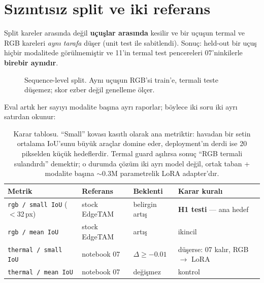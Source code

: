 \documentclass[11pt, paper=a4, DIV=14, parskip=half, numbers=noenddot]{scrartcl}
\newcommand{\code}[1]{\texttt{\small #1}}
\begin{document}
\section{Sızıntısız split ve iki referans}

Split kareler arasında değil \textbf{uçuşlar arasında} kesilir ve bir uçuşun
termal ve RGB kareleri \emph{aynı tarafa} düşer (unit test ile sabitlendi).
Sonuç: held-out bir uçuş hiçbir modalitede görülmemiştir ve 11'in termal test
pencereleri 07'ninkilerle \textbf{birebir aynıdır}.

\begin{figure}[H]
\centering
{}
\caption{Sequence-level split. Aynı uçuşun RGB'si train'e, termali teste
düşemez; skor ezber değil genelleme ölçer.}
\end{figure}

Eval artık her sayıyı modalite başına ayrı raporlar; böylece iki soru iki
ayrı satırdan okunur:

\begin{table}[H]
\centering\small
\begin{tabular}{@{}llll@{}}
\toprule
Metrik & Referans & Beklenti & Karar kuralı \\
\midrule
\code{rgb / small IoU} ($<$32\,px) & stock EdgeTAM & \textcolor{yesilvurgu}{belirgin artış} &
  \textbf{H1 testi} --- ana hedef \\
\code{rgb / mean IoU} & stock EdgeTAM & artış & ikincil \\
\code{thermal / small IoU} & notebook 07 & $\Delta \geq -0.01$ &
  düşerse: 07 kalır, RGB $\rightarrow$ LoRA \\
\code{thermal / mean IoU} & notebook 07 & değişmez & kontrol \\
\bottomrule
\end{tabular}
\caption{Karar tablosu. ``Small'' kovası kasıtlı olarak ana metriktir: havadan
bir setin ortalama IoU'sunu büyük araçlar domine eder, deployment'ın derdi
ise 20 pikselden küçük hedeflerdir. Termal guard aşılırsa sonuç ``RGB termali
sulandırdı'' demektir; o durumda çözüm iki ayrı model değil, ortak taban +
modalite başına $\sim$0.3M parametrelik LoRA adapter'dır.}
\end{table}
\end{document}
